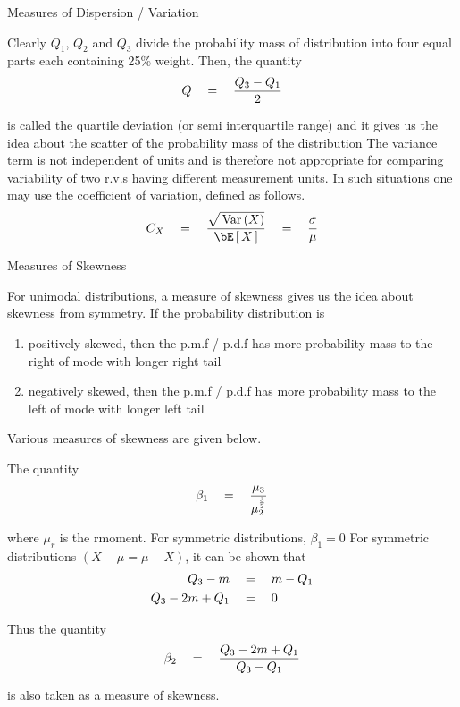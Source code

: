 \documentclass{article}
\begin{document}
\begin{ssection}{Measures of Dispersion / Variation}
\begin{enumerate}[label=\bt{\theenumi.}]
			Clearly $Q_1$, $Q_2$ and $Q_3$ divide the probability mass of distribution into four equal parts each containing 25\% weight. Then, the quantity
			\begin{align*}
				Q	\quad = \quad	\frac{Q_3 - Q_1}{2}
			\end{align*}

			is called the quartile deviation (or semi interquartile range) and it gives us the idea about the scatter of the probability mass of the distribution
			 The variance term is not independent of units and is therefore not appropriate for comparing variability of two r.v.s having different measurement units.  In such situations one may use the coefficient of variation, defined as follows.
			\begin{align*}
				C_X	\eq	\frac{\sqrt{\var{X}}}{\E{X}}	\eq	\frac{\sigma}{\mu}
			\end{align*}
		\end{enumerate}

\end{ssection}

\begin{ssection}{Measures of Skewness}

	For unimodal distributions, a measure of skewness gives us the idea about skewness from symmetry. If the probability distribution is

	\begin{enumerate}[label=(\roman*)]
		\item positively skewed, then the p.m.f / p.d.f has more probability mass to the right of mode with longer right tail
		\item negatively skewed, then the p.m.f / p.d.f has more probability mass to the left of mode with longer left tail
	\end{enumerate}

	Various measures of skewness are given below.

	\begin{enumerate}[label=\bt{\theenumi.}]
			 The quantity
			\begin{align*}
				\beta_1	\quad = \quad	\frac{\mu_3}{\mu_2^\frac{3}{2}}
			\end{align*}

			where $\mu_r$ is the r\tth moment. For symmetric distributions, $\beta_1 = 0$
			 For symmetric distributions $(X - \mu = \mu - X)$, it can be shown that
			\begin{align*}
				Q_3 - m			&\quad = \quad	m - Q_1 \\
				Q_3 - 2m + Q_1	&\quad = \quad	0
			\end{align*}

			Thus the quantity
			\begin{align*}
				\beta_2	\quad = \quad	\frac{Q_3 - 2m + Q_1}{Q_3 - Q_1}
			\end{align*}

			is also taken as a measure of skewness.
	\end{enumerate}

\end{ssection}
\end{document}
